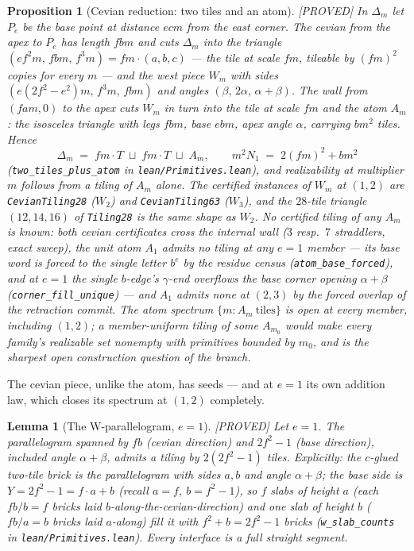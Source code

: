 \documentclass[11pt,reqno]{amsart}
\theoremstyle{plain}
\newtheorem{lemma}[theorem]{Lemma}
\newtheorem{proposition}[theorem]{Proposition}
\theoremstyle{definition}
\newcommand{\lab}[1]{\hfill\textnormal{\footnotesize\textsc{[#1]}}}
\begin{document}
\begin{proposition}[Cevian reduction: two tiles and an atom]\label{prop:cevianatom}\lab{PROVED}
In $\Delta_m$ let $P_e$ be the base point at distance $ecm$ from the east corner. The cevian from
the apex to $P_e$ has length $fbm$ and cuts $\Delta_m$ into the triangle
$(ef^2m,\,fbm,\,f^3m)=fm\cdot(a,b,c)$ --- the tile at scale $fm$, tileable by $(fm)^2$ copies for
every $m$ --- and the west piece $W_m$ with sides $(e(2f^2-e^2)m,\,f^3m,\,fbm)$ and angles
$(\beta,\,2\alpha,\,\alpha+\beta)$. The wall from $(fam,0)$ to the apex cuts $W_m$ in turn into
the tile at scale $fm$ and the \emph{atom} $A_m$: the isosceles triangle with legs $fbm$, base
$ebm$, apex angle $\alpha$, carrying $bm^2$ tiles. Hence
\[
\Delta_m \;=\; fm\cdot T \;\sqcup\; fm\cdot T \;\sqcup\; A_m,
\qquad m^2N_1 \;=\; 2(fm)^2 + bm^2
\]
(\texttt{two\_tiles\_plus\_atom} in \textup{\texttt{lean/Primitives.lean}}), and realizability at
multiplier $m$ follows from a tiling of $A_m$ alone. The certified instances of $W_m$ at $(1,2)$
are \texttt{CevianTiling28} ($W_2$) and \texttt{CevianTiling63} ($W_3$), and the $28$-tile
triangle $(12,14,16)$ of \texttt{Tiling28} is the same shape as $W_2$. No certified tiling of any
$A_m$ is known: both cevian certificates cross the internal wall ($3$ resp.\ $7$ straddlers,
exact sweep), the unit atom $A_1$ admits no tiling at any $e=1$ member --- its base word is forced
to the single letter $b^e$ by the residue census (\texttt{atom\_base\_forced}), and at $e=1$ the
single $b$-edge's $\gamma$-end overflows the base corner opening $\alpha+\beta$
(\texttt{corner\_fill\_unique}) --- and $A_1$ admits none at $(2,3)$ by the forced overlap of the
retraction commit. The atom spectrum $\{m:A_m\ \text{tiles}\}$ is open at every member, including
$(1,2)$; a member-uniform tiling of some $A_{m_0}$ would make every family's realizable set
nonempty with primitives bounded by $m_0$, and is the sharpest open construction question of the
branch.
\end{proposition}

The cevian piece, unlike the atom, has seeds --- and at $e=1$ its own addition law, which closes
its spectrum at $(1,2)$ completely.

\begin{lemma}[The W-parallelogram, $e=1$]\label{lem:wpgram}\lab{PROVED}
Let $e=1$. The parallelogram spanned by $fb$ (cevian direction) and $2f^2-1$ (base direction),
included angle $\alpha+\beta$, admits a tiling by $2(2f^2-1)$ tiles. Explicitly: the $c$-glued
two-tile brick is the parallelogram with sides $a,b$ and angle $\alpha+\beta$; the base side is
$Y=2f^2-1=f\cdot a+b$ (recall $a=f$, $b=f^2-1$), so $f$ slabs of height $a$ (each $fb/b=f$
bricks laid $b$-along-the-cevian-direction) and one slab of height $b$ ($fb/a=b$ bricks laid
$a$-along) fill it with $f^2+b=2f^2-1$ bricks
(\texttt{w\_slab\_counts} in \textup{\texttt{lean/Primitives.lean}}). Every interface is a full
straight segment.
\end{lemma}
\end{document}
